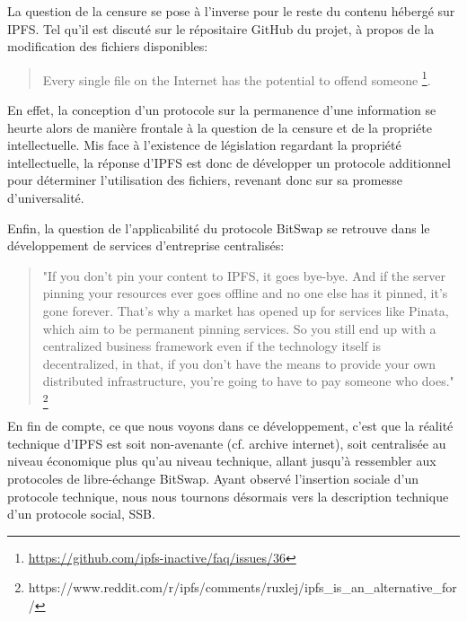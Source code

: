 \documentclass{article}
\begin{document}
La question de la censure se pose à l'inverse pour le reste du contenu hébergé sur IPFS. Tel qu'il est discuté sur le répositaire GitHub du projet, à propos de la modification des fichiers disponibles:

\begin{quote}
    Every single file on the Internet has the potential to offend someone \footnote{\url{https://github.com/ipfs-inactive/faq/issues/36}}.
\end{quote}

En effet, la conception d'un protocole sur la permanence d'une information se heurte alors de manière frontale à la question de la censure et de la propriéte intellectuelle. Mis face à l'existence de législation regardant la propriété intellectuelle, la réponse d'IPFS est donc de développer un protocole additionnel pour déterminer l'utilisation des fichiers, revenant donc sur sa promesse d'universalité.

Enfin, la question de l'applicabilité du protocole BitSwap se retrouve dans le développement de services d'entreprise centralisés:

\begin{quote}
    "If you don't pin your content to IPFS, it goes bye-bye. And if the server pinning your resources ever goes offline and no one else has it pinned, it's gone forever. That's why a market has opened up for services like Pinata, which aim to be permanent pinning services. So you still end up with a centralized business framework even if the technology itself is decentralized, in that, if you don't have the means to provide your own distributed infrastructure, you're going to have to pay someone who does." \footnote{https://www.reddit.com/r/ipfs/comments/ruxlej/ipfs_is_an_alternative_for/}
\end{quote}

En fin de compte, ce que nous voyons dans ce développement, c'est que la réalité technique d'IPFS est soit non-avenante (cf. archive internet), soit centralisée au niveau économique plus qu'au niveau technique, allant jusqu'à ressembler aux protocoles de libre-échange BitSwap. Ayant observé l'insertion sociale d'un protocole technique, nous nous tournons désormais vers la description technique d'un protocole social, SSB.

\pagebreak



\end{document}
